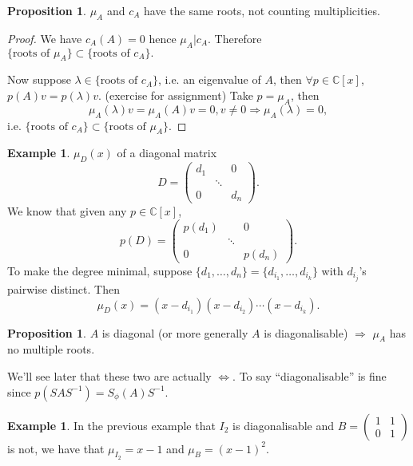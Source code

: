 \documentclass[a4paper]{article}
\theoremstyle{definition}
\newtheorem{prop}[defn]{Proposition}
\newtheorem{example}[defn]{Example}
\begin{document}
\begin{prop}
	$\mu_{A}$ and $c_{A}$ have the same roots, not counting multiplicities.
\end{prop}

\begin{proof}
	We have $c_{A}(A)=0$ hence $\mu_{A} | c_{A}$. Therefore $\{\text{roots of }\mu_{A}\} \subset \{\text{roots of }c_{A}\} .$

	Now suppose $\lambda \in \{\text{roots of }c_{A}\}$, i.e. an eigenvalue of $A$, then $\forall p \in \mathbb C [x]$, $p(A)v=p(\lambda )v .$ (exercise for assignment) Take $p=\mu_{A}$, then
\[
\mu_{A}(\lambda) v = \mu_{A}(A)v=0, v\neq 0 \Rightarrow \mu_{A}(\lambda)=0,
\]
i.e. $\{\text{roots of }c_{A}\} \subset \{\text{roots of }\mu_{A}\} .$
\end{proof}

\begin{example}
	$\mu_{D}(x)$ of a diagonal matrix
\[
D=\begin{pmatrix}
		d_1 & & 0 \\ & \ddots & \\ 0 & & d_n
	\end{pmatrix} .
\]
We know that given any $p\in \mathbb C [x]$,
\[
p(D) = \begin{pmatrix}
		p(d_1) & & 0 \\ & \ddots & \\ 0 & & p(d_n)
	\end{pmatrix} .
\]
To make the degree minimal, suppose $\{d_1,\ldots,d_n\}=\{d_{i_1},\ldots,d_{i_k}\}$ with $d_{i_j}$'s pairwise distinct. Then
\[
\mu_{D}(x)=(x-d_{i_1})(x-d_{i_2})\cdots (x-d_{i_k}) .
\]
\end{example}

\begin{prop}
	$A$ is diagonal (or more generally $A$ is diagonalisable) $\Rightarrow$ $\mu_{A}$ has no multiple roots.
\end{prop}

We'll see later that these two are actually $\Leftrightarrow$. To say ``diagonalisable'' is fine since $p(SAS^{-1})=S_{\phi}(A)S^{-1} .$

\begin{example}
In the previous example that $I_2$ is diagonalisable and $B=\begin{pmatrix}
	1&1\\0&1
\end{pmatrix}$ is not, we have that $\mu_{I_2}=x-1$ and $\mu_{B}=(x-1)^2$.
\end{example}	
\end{document}
